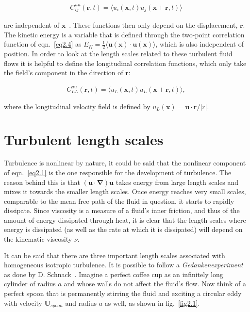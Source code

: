 \documentclass[12pt,a4paper]{report}
\begin{document}
\begin{align}
 C_{ij}^{uu}(\bm r, t) = \langle u_i(\bm x, t) u_j(\bm x + \bm r, t) \rangle
 \label{eq2.4}
\end{align}

are independent of $\bm x$~\cite{biskamp1997nonlinear}. These functions then only depend on the displacement, $\bm r$. The kinetic energy is a variable that is defined through the two-point correlation function of eqn.~\ref{eq2.4} as $E_K = \frac{1}{2} \langle \bm u (\bm x) \cdot \bm u (\bm x) \rangle$, which is also independent of position. In order to look at the length scales related to these turbulent fluid flows it is helpful to define the longitudinal correlation functions, which only take the field's component in the direction of $\bm r$: 

\begin{align}
 C_{LL}^{uu}(\bm r, t) = \langle u_L(\bm x, t)u_L(\bm x + \bm r, t) \rangle,
 \label{eq2.5}
\end{align}

where the longitudinal velocity field is defined by $u_L(\bm x)=\bm u \cdot \bm r / \vert r \vert$. 

\section{Turbulent length scales}
\label{sec2.4}

Turbulence is nonlinear by nature, it could be said that the nonlinear component of eqn.~\ref{eq2.1} is the one responsible for the development of turbulence. The reason behind this is that $(\bm u \cdot \bm \nabla) \bm u$ takes energy from large length scales and mixes it towards the smaller length scales. Once energy reaches very small scales, comparable to the mean free path of the fluid in question, it starts to rapidly dissipate. Since viscosity is a measure of a fluid's inner friction, and thus of the amount of energy dissipated through heat, it is clear that the length scales where energy is dissipated (as well as the rate at which it is dissipated) will depend on the kinematic viscosity $\nu$. 

It can be said that there are three important length scales associated with homogeneous isotropic turbulence. It is possible to follow a \textit{Gedankenexperiment} as done by D. Schnack~\cite{schnack2009lectures}. Imagine a perfect coffee cup as an infinitely long cylinder of radius $a$ and whose walls do not affect the fluid's flow. Now think of a perfect spoon that is permanently stirring the fluid and exciting a circular eddy with velocity $\bm U_{spoon}$ and radius $a$ as well, as shown in fig.~\ref{fig2.1}.
\end{document}
